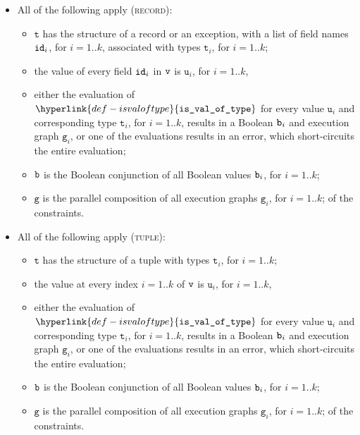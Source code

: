 \documentclass{book}
\newcommand\isvaloftype[0]{\hyperlink{def-isvaloftype}{\texttt{is\_val\_of\_type}}}
\newcommand\vg[0]{\texttt{g}}
\newcommand\vt[0]{\texttt{t}}
\newcommand\vu[0]{\texttt{u}}
\begin{document}
\begin{itemize}
  \item All of the following apply (\textsc{record}):
  \begin{itemize}
    \item $\vt$ has the structure of a record or an exception, with a list of field names
    $\texttt{id}_i$, for $i=1..k$, associated with types $\vt_i$, for $i=1..k$;
    \item the value of every field $\texttt{id}_i$ in $\texttt{v}$ is $\vu_i$, for $i=1..k$,
    \item either the evaluation of $\isvaloftype$ for every value $\vu_i$
    and corresponding type $\vt_i$, for $i=1..k$,
    results in a Boolean $\texttt{b}_i$ and execution graph $\vg_i$,
    or one of the evaluations results in an error,
    which short-circuits the entire evaluation;
    \item $\texttt{b}$ is the Boolean conjunction of all Boolean values $\texttt{b}_i$, for $i=1..k$;
    \item $\vg$ is the parallel composition of all execution graphs $\vg_i$, for $i=1..k$;
    of the constraints.
  \end{itemize}

  \item All of the following apply (\textsc{tuple}):
  \begin{itemize}
    \item $\vt$ has the structure of a tuple with types $\vt_i$, for $i=1..k$;
    \item the value at every index $i=1..k$ of $\texttt{v}$ is $\vu_i$, for $i=1..k$,
    \item either the evaluation of $\isvaloftype$ for every value $\vu_i$
    and corresponding type $\vt_i$, for $i=1..k$,
    results in a Boolean $\texttt{b}_i$ and execution graph $\vg_i$,
    or one of the evaluations results in an error,
    which short-circuits the entire evaluation;
    \item $\texttt{b}$ is the Boolean conjunction of all Boolean values $\texttt{b}_i$, for $i=1..k$;
    \item $\vg$ is the parallel composition of all execution graphs $\vg_i$, for $i=1..k$;
    of the constraints.
  \end{itemize}


\end{itemize}
\end{document}

